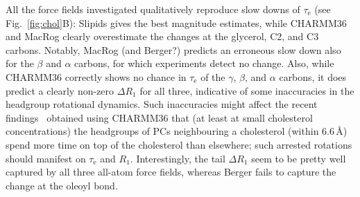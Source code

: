 \documentclass[journal=jpcbfk,manuscript=article,layout=twocolumn]{achemso}
\begin{document}
All the force fields investigated qualitatively reproduce slow downs of $\tau_\mathrm e$ (see Fig.~\ref{fig:chol}B):
Slipids gives the best magnitude estimates, while CHARMM36 and MacRog clearly overestimate the changes at the glycerol, C2, and C3 carbons. Notably, MacRog {\color{red} (and Berger?)} predicts an erroneous slow down also for the $\beta$ and $\alpha$ carbons, for which experiments detect no change.
%
Also,  while CHARMM36 correctly shows no chance in $\tau_\mathrm{e}$
of the $\gamma$, $\beta$, and $\alpha$ carbons,
it does predict a clearly non-zero $\Delta R_{1}$ for all three, indicative of some inaccuracies in the
headgroup rotational dynamics. %
Such inaccuracies might affect the recent findings~\cite{leeb18}
obtained using CHARMM36
that 
(at least at small cholesterol concentrations)
the headgroups of PCs neighbouring a cholesterol (within 6.6\,\AA) spend more time on top of the cholesterol than elsewhere;
such arrested rotations should manifest on $\tau_\mathrm e$ and $R_1$.
%
Interestingly, 
the tail $\Delta R_{1}$ seem to be pretty well captured by
all three all-atom force fields, whereas Berger fails to capture the change at the oleoyl bond.


\end{document}
